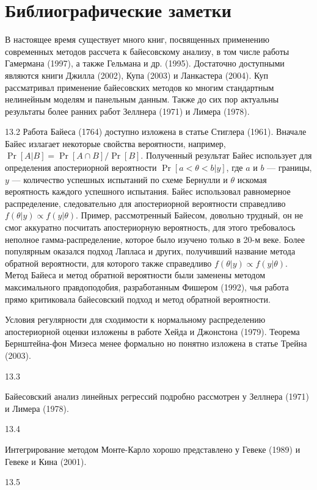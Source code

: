 \section{Библиографические заметки}

В настоящее время существует много книг, посвященных применению современных методов рассчета к байесовскому анализу, в том числе работы Гамермана (1997), а также Гельмана и др. (1995). Достаточно доступными являются книги Джилла (2002), Купа (2003) и Ланкастера (2004). Куп рассматривал применение байесовских методов ко многим стандартным нелинейным моделям и панельным данным. Также до сих пор актуальны результаты более ранних работ Зеллнера (1971) и Лимера (1978).

13.2 Работа Байеса (1764) доступно изложена в статье Стиглера (1961). Вначале Байес излагает некоторые свойства вероятности, например, $\Pr[A|B]=\Pr[A\cap B]/\Pr[B]$. Полученный результат Байес использует для определения апостериорной вероятности $\Pr[a<\theta<b |y]$, где $a$ и  $b$ --- границы, $y$ --- количество успешных испытаний по схеме Бернулли и $\theta$ искомая вероятность каждого успешного испытания. Байес использовал равномерное распределение, следовательно для апостериорной вероятности справедливо $f(\theta|y){\propto}f(y|\theta)$. Пример, рассмотренный Байесом, довольно трудный, он не смог аккуратно посчитать апостериорную вероятность, для этого требовалось неполное гамма-распределение, которое было изучено только в 20-м веке. Более популярным оказался подход Лапласа и других, получивший название метода обратной вероятности,  для которого также справедливо $f(\theta|y){\propto}f(y|\theta)$. Метод Байеса и метод обратной вероятности были заменены  методом максимального правдоподобия, разработанным Фишером (1992), чья работа прямо критиковала байесовский подход и метод обратной вероятности. 

Условия регулярности для сходимости к нормальному распределению апостериорной  оценки  изложены в работе Хейда и Джонстона (1979). Теорема Бернштейна-фон Мизеса  менее формально  но понятно изложена  в статье Трейна (2003).

13.3

Байесовский анализ линейных регрессий подробно рассмотрен у Зеллнера (1971) и Лимера (1978).

13.4

Интегрирование методом Монте-Карло хорошо представлено у Гевеке (1989) и Гевеке и Кина (2001).

13.5

